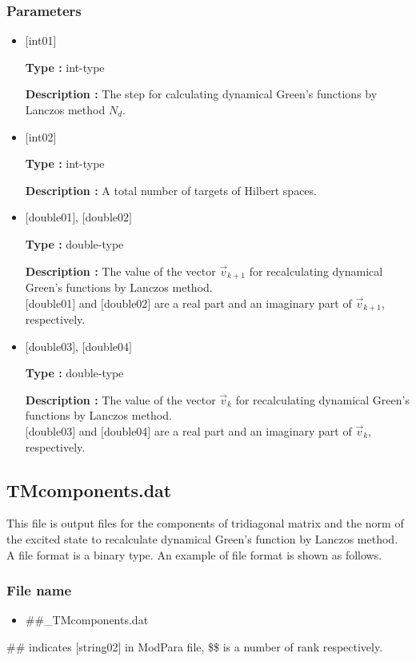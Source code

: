 \subsubsection{Parameters}
 \begin{itemize}

  \item  $[$int01$]$

 {\bf Type :} int-type

 {\bf Description :} The step for calculating dynamical Green's functions by Lanczos method $N_d$.

  \item  $[$int02$]$

 {\bf Type :} int-type

{\bf Description :}  A total number of targets of Hilbert spaces.

 
 \item  $[$double01$]$, $[$double02$]$

 {\bf Type :} double-type 

{\bf Description :} The value of the vector $\vec{v}_{k+1}$ for recalculating dynamical Green's functions by Lanczos method.\\
$[$double01$]$ and $[$double02$]$ are a real part and an imaginary part of $\vec{v}_{k+1}$, respectively.

\item  $[$double03$]$, $[$double04$]$

 {\bf Type :} double-type 

{\bf Description :} The value of the vector $\vec{v}_{k}$ for recalculating dynamical Green's functions by Lanczos method.\\
$[$double03$]$ and $[$double04$]$ are a real part and an imaginary part of $\vec{v}_{k}$, respectively.
\end{itemize}

\newpage
\subsection{{TMcomponents.dat}}
This file is output files for the components of tridiagonal matrix and the norm of the excited state to recalculate dynamical Green's function by Lanczos method. 
A file format is a binary type. 
An example of file format is shown as follows.

\subsubsection{File name}
\begin{itemize}
   \item{\#\#\_TMcomponents.dat}
\end{itemize}
\#\# indicates [string02] in ModPara file, \$\$ is a number of rank respectively. 

